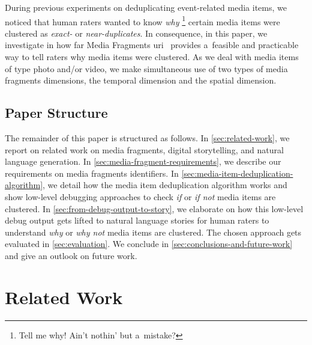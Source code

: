 \documentclass{article}
\begin{document}
During previous experiments on deduplicating event-related media items,
we noticed that human raters wanted to know \emph{why}%
\footnote{Tell me why! Ain't nothin' but a~mistake?}
certain media items were clustered as \emph{exact-} or \emph{near-duplicates}.
In consequence, in this paper, we investigate in how far
Media Fragments {\sc uri}~\cite{troncy2012mediafragments}
provides a~feasible and practicable way
to tell raters why media items were clustered.
As we deal with media items of type photo and/or video,
we make simultaneous use of two types of media fragments dimensions,
the temporal dimension and the spatial dimension.

\subsection{Paper Structure}
\label{sec:paper-structure}

The remainder of this paper is structured as follows.
In \autoref{sec:related-work}, we report on related work
on media fragments, digital storytelling, and natural language generation.
In \autoref{sec:media-fragment-requirements}, we describe
our requirements on media fragments identifiers.
In \autoref{sec:media-item-deduplication-algorithm},
we detail how the media item deduplication algorithm works
and show low-level debugging approaches to check
\emph{if} or \emph{if not} media items are clustered.
In \autoref{sec:from-debug-output-to-story},
we elaborate on how this low-level debug output gets lifted
to natural language stories for human raters to understand
\emph{why} or \emph{why not} media items are clustered.
The chosen approach gets evaluated in \autoref{sec:evaluation}.
We conclude in \autoref{sec:conclusions-and-future-work}
and give an outlook on future work.

\section{Related Work}
\label{sec:related-work}
\end{document}
